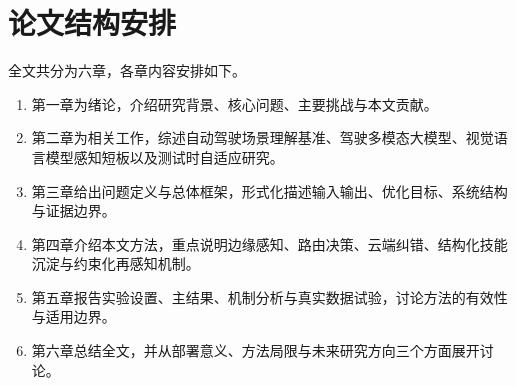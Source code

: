 \section{论文结构安排}
\label{sec:intro-organization}

全文共分为六章，各章内容安排如下。

\begin{enumerate}
  \item 第一章为绪论，介绍研究背景、核心问题、主要挑战与本文贡献。
  \item 第二章为相关工作，综述自动驾驶场景理解基准、驾驶多模态大模型、视觉语言模型感知短板以及测试时自适应研究。
  \item 第三章给出问题定义与总体框架，形式化描述输入输出、优化目标、系统结构与证据边界。
  \item 第四章介绍本文方法，重点说明边缘感知、路由决策、云端纠错、结构化技能沉淀与约束化再感知机制。
  \item 第五章报告实验设置、主结果、机制分析与真实数据试验，讨论方法的有效性与适用边界。
  \item 第六章总结全文，并从部署意义、方法局限与未来研究方向三个方面展开讨论。
\end{enumerate}

